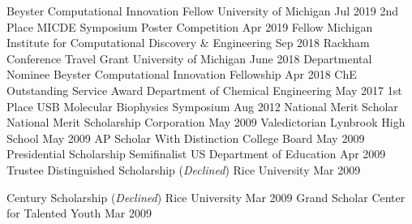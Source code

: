 
\begin{cvhonors}
  \cvhonor
    {Beyster Computational Innovation Fellow} %
    {University of Michigan} %
    {} %
    {Jul 2019} %
  \cvhonor
    {2nd Place} %
    {MICDE Symposium Poster Competition} %
    {} %
    {Apr 2019} %
  \cvhonor
    {Fellow} %
    {Michigan Institute for Computational Discovery \& Engineering} %
    {} %
    {Sep 2018} %
  \cvhonor
    {Rackham Conference Travel Grant} %
    {University of Michigan} %
    {} %
    {June 2018} %
  \cvhonor
    {Departmental Nominee} %
    {Beyster Computational Innovation Fellowship} %
    {} %
    {Apr 2018} %
  \cvhonor
    {ChE Outstanding Service Award} %
    {Department of Chemical Engineering} %
    {} %
    {May 2017} %
\ifoutdated
  \cvhonor
    {1st Place} %
    {USB Molecular Biophysics Symposium} %
    {} %
    {Aug 2012} %
  \cvhonor
    {National Merit Scholar} %
    {National Merit Scholarship Corporation} %
    {} %
    {May 2009} %
  \cvhonor
    {Valedictorian} %
    {Lynbrook High School} %
    {} %
    {May 2009} %
  \cvhonor
    {AP Scholar With Distinction} %
    {College Board} %
    {} %
    {May 2009} %
  \cvhonor
    {Presidential Scholarship Semifinalist} %
    {US Department of Education} %
    {} %
    {Apr 2009} %
  \cvhonor
    {Trustee Distinguished Scholarship (\emph{Declined})} %
    {Rice University} %
    {} %
    {Mar 2009} %

  \cvhonor
    {Century Scholarship (\emph{Declined})} %
    {Rice University} %
    {} %
    {Mar 2009} %
  \cvhonor
    {Grand Scholar} %
    {Center for Talented Youth} %
    {} %
    {Mar 2009} %
\fi
\end{cvhonors}
